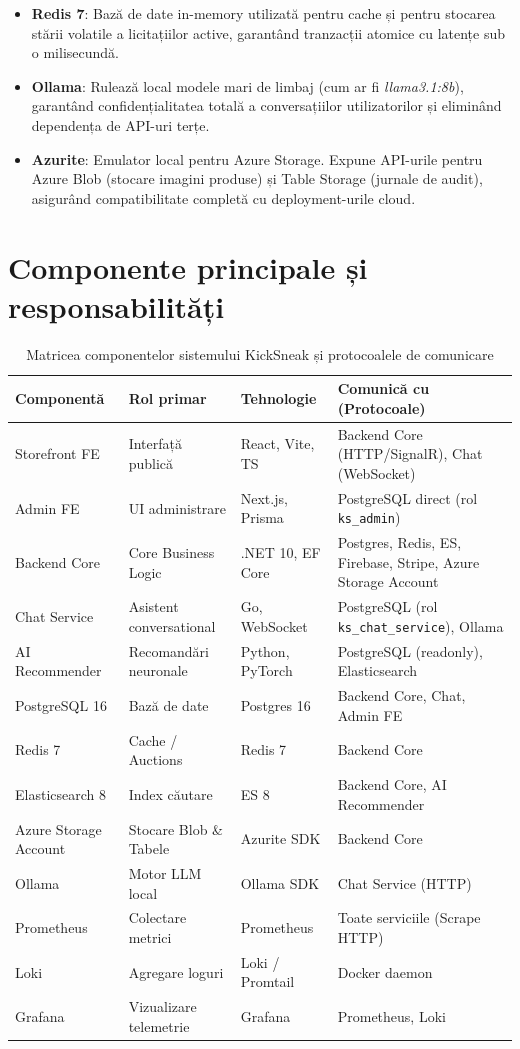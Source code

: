 \begin{itemize}
    \item \textbf{Redis 7}: Bază de date in-memory utilizată pentru cache și pentru stocarea stării volatile a licitațiilor active, garantând tranzacții atomice cu latențe sub o milisecundă.
    \item \textbf{Ollama}: Rulează local modele mari de limbaj (cum ar fi \textit{llama3.1:8b}), garantând confidențialitatea totală a conversațiilor utilizatorilor și eliminând dependența de API-uri terțe.
    \item \textbf{Azurite}: Emulator local pentru Azure Storage. Expune API-urile pentru Azure Blob (stocare imagini produse) și Table Storage (jurnale de audit), asigurând compatibilitate completă cu deployment-urile cloud.
\end{itemize}

\section{Componente principale și responsabilități}

\begin{table}[htbp]
\centering
\small
\begin{tabular}{|p{3cm}|p{3cm}|p{2.8cm}|p{5.8cm}|}
\hline
\textbf{Componentă} & \textbf{Rol primar} & \textbf{Tehnologie} & \textbf{Comunică cu (Protocoale)} \\
\hline
Storefront FE & Interfață publică & React, Vite, TS & Backend Core (HTTP/SignalR), Chat (WebSocket) \\
\hline
Admin FE & UI administrare & Next.js, Prisma & PostgreSQL direct (rol \texttt{ks\_admin}) \\
\hline
Backend Core & Core Business Logic & .NET 10, EF Core & Postgres, Redis, ES, Firebase, Stripe, Azure Storage Account \\
\hline
Chat Service & Asistent conversational & Go, WebSocket & PostgreSQL (rol \texttt{ks\_chat\_service}), Ollama \\
\hline
AI Recommender & Recomandări neuronale & Python, PyTorch & PostgreSQL (readonly), Elasticsearch \\
\hline
PostgreSQL 16 & Bază de date & Postgres 16 & Backend Core, Chat, Admin FE \\
\hline
Redis 7 & Cache / Auctions & Redis 7 & Backend Core \\
\hline
Elasticsearch 8 & Index căutare & ES 8 & Backend Core, AI Recommender \\
\hline
Azure Storage Account & Stocare Blob \& Tabele & Azurite SDK & Backend Core \\
\hline
Ollama & Motor LLM local & Ollama SDK & Chat Service (HTTP) \\
\hline
Prometheus & Colectare metrici & Prometheus & Toate serviciile (Scrape HTTP) \\
\hline
Loki & Agregare loguri & Loki / Promtail & Docker daemon \\
\hline
Grafana & Vizualizare telemetrie & Grafana & Prometheus, Loki \\
\hline
\end{tabular}
\caption{Matricea componentelor sistemului KickSneak și protocoalele de comunicare}
\label{tab:componente}
\end{table}

